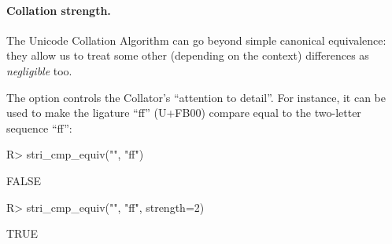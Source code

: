 \documentclass[nojss]{jss}\usepackage[]{graphicx}\usepackage[]{color}
\begin{document}


\paragraph{Collation strength.}
The Unicode Collation Algorithm \citep{uts10:collation}
can go beyond simple canonical equivalence:
they allow us to treat some other (depending on the context)
differences as \textit{negligible} too.

The  option controls the Collator's ``attention to detail''.
For instance, it can be used to make the ligature ``ff'' (U+FB00)
compare equal to the two-letter sequence ``f{}f'':

\begin{Schunk}
\begin{Sinput}
R> stri_cmp_equiv("", "ff")
\end{Sinput}
\begin{Soutput}
[1] FALSE
\end{Soutput}
\begin{Sinput}
R> stri_cmp_equiv("", "ff", strength=2)
\end{Sinput}
\begin{Soutput}
[1] TRUE
\end{Soutput}
\end{Schunk}


\clearpage
\end{document}

